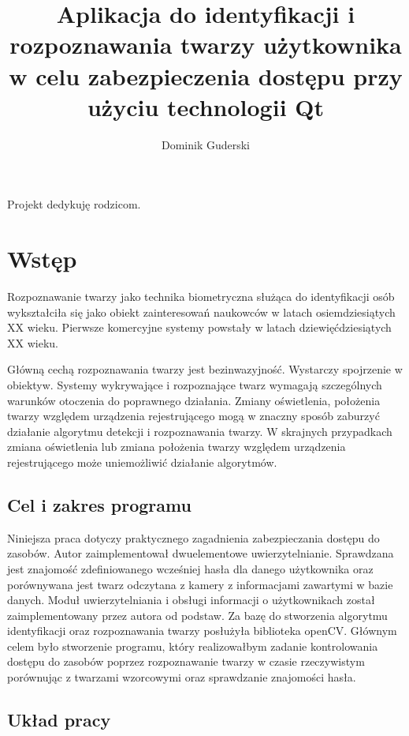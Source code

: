 \documentclass[eng,printmode]{mgr}
\title{Aplikacja do identyfikacji i rozpoznawania twarzy użytkownika w celu zabezpieczenia dostępu przy użyciu technologii Qt}
\author{Dominik Guderski}
\begin{document}

\maketitle %
\dedication{6cm}{Projekt dedykuję rodzicom.}

\tableofcontents %


\chapter{Wstęp}
Rozpoznawanie twarzy jako technika biometryczna służąca do identyfikacji osób wykształciła się jako obiekt zainteresowań naukowców w latach osiemdziesiątych XX wieku. Pierwsze komercyjne systemy powstały w latach dziewięćdziesiątych XX wieku.\cite{historyreco}

Główną cechą rozpoznawania twarzy jest bezinwazyjność. Wystarczy spojrzenie w obiektyw. Systemy wykrywające i rozpoznające twarz wymagają szczególnych warunków otoczenia do poprawnego działania. Zmiany oświetlenia, położenia twarzy względem urządzenia rejestrującego mogą w znaczny sposób zaburzyć działanie algorytmu detekcji i rozpoznawania twarzy. W skrajnych przypadkach zmiana oświetlenia lub zmiana położenia twarzy względem urządzenia rejestrującego może uniemożliwić działanie algorytmów.
\section{Cel i zakres programu}

Niniejsza praca dotyczy praktycznego zagadnienia zabezpieczania dostępu do zasobów. Autor zaimplementował dwuelementowe uwierzytelnianie. Sprawdzana jest znajomość zdefiniowanego wcześniej hasła dla danego użytkownika oraz porównywana jest twarz odczytana z kamery z informacjami zawartymi w bazie danych. Moduł uwierzytelniania i obsługi informacji o użytkownikach został zaimplementowany przez autora od podstaw. Za bazę do stworzenia algorytmu identyfikacji oraz rozpoznawania twarzy posłużyła biblioteka openCV. Głównym celem było stworzenie programu, który realizowałbym zadanie kontrolowania dostępu do zasobów poprzez rozpoznawanie twarzy w czasie rzeczywistym porównując z twarzami wzorcowymi oraz sprawdzanie znajomości hasła.

\section{Układ pracy}
\end{document}
